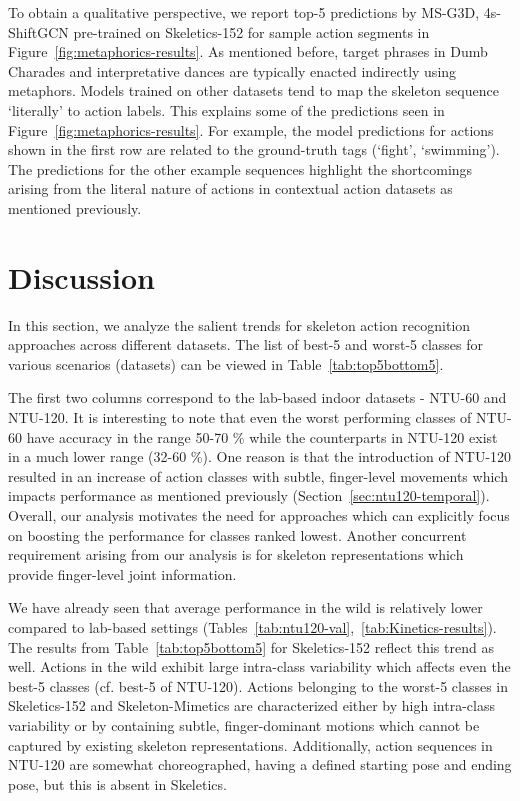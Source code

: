 \documentclass[twocolumn]{svjour3}          \smartqed  \usepackage{graphicx}
\begin{document}
To obtain a qualitative perspective, we report top-5 predictions by MS-G3D, 4s-ShiftGCN pre-trained on Skeletics-152 for sample action segments in Figure~\ref{fig:metaphorics-results}. As mentioned before, target phrases in Dumb Charades and interpretative dances are typically enacted indirectly using metaphors. Models trained on other datasets tend to map the skeleton sequence `literally' to action labels. This explains some of the predictions seen in Figure~\ref{fig:metaphorics-results}. For example, the model predictions for actions shown in the first row are related to the ground-truth tags (`fight', `swimming'). The predictions for the other example sequences highlight the shortcomings arising from the literal nature of actions in contextual action datasets as mentioned previously.

\section{Discussion}
\label{sec:qualitative}

In this section, we analyze the salient trends for skeleton action recognition approaches across different datasets. The list of best-5 and worst-5 classes for various scenarios (datasets) can be viewed in Table~\ref{tab:top5bottom5}.

The first two columns correspond to the lab-based indoor datasets - NTU-60 and NTU-120. It is interesting to note that even the worst performing classes of NTU-60 have accuracy in the range 50-70 \% while the counterparts in NTU-120 exist in a much lower range (32-60 \%). One reason is that the introduction of NTU-120 resulted in an increase of action classes with subtle, finger-level movements which impacts performance as mentioned previously (Section~\ref{sec:ntu120-temporal}). Overall, our analysis motivates the need for approaches which can explicitly focus on boosting the performance for classes ranked lowest. Another concurrent requirement arising from our analysis is for skeleton representations which provide finger-level joint information.

We have already seen that average performance in the wild is relatively lower compared to lab-based settings (Tables~\ref{tab:ntu120-val},~\ref{tab:Kinetics-results}). The results from Table~\ref{tab:top5bottom5} for Skeletics-152 reflect this trend as well. Actions in the wild exhibit large intra-class variability which affects even the best-5 classes (cf. best-5 of NTU-120). Actions belonging to the worst-5 classes in Skeletics-152 and Skeleton-Mimetics are characterized either by high intra-class variability or by containing subtle, finger-dominant motions which cannot be captured by existing skeleton representations. Additionally, action sequences in NTU-120 are somewhat choreographed, having a defined starting pose and ending pose, but this is absent in Skeletics.
\end{document}

